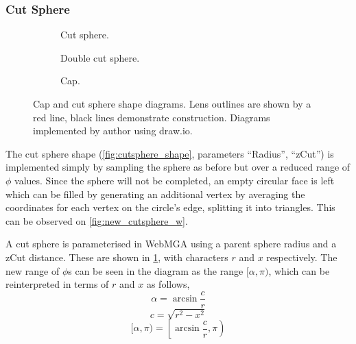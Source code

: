 \subsubsection{Cut Sphere}
\label{cut_sphere_section}
\begin{figure}
  \begin{center}
    \begin{subfigure}{0.3\textwidth}
      
      \caption{Cut sphere.}
      \label{fig:cut_sphere_diagram}
    \end{subfigure}
    \begin{subfigure}{0.3\textwidth}
      
      \caption{Double cut sphere.}
      \label{fig:double_cut_diagram}
    \end{subfigure}
    \begin{subfigure}{0.3\textwidth}
      
      \caption{Cap.}
      \label{fig:cap_diagram}
    \end{subfigure}
  \end{center}
  \caption{Cap and cut sphere shape diagrams. Lens outlines are shown by a red line, black lines demonstrate construction. Diagrams implemented by author using draw.io\cite{drawio}.}
  \label{fig:cap_cut_descriptions}
\end{figure}
The cut sphere shape (\cref{fig:cutsphere_shape}, parameters ``Radius'', ``zCut'') is implemented simply by sampling the sphere as before but over a reduced range of $\phi$ values. Since the sphere will not be completed, an empty circular face is left which can be filled by generating an additional vertex by averaging the coordinates for each vertex on the circle's edge, splitting it into triangles. This can be observed on \cref{fig:new_cutsphere_w}.

A cut sphere is parameterised in WebMGA using a parent sphere radius and a zCut distance. These are shown in \cref{fig:cut_sphere_diagram}, with characters $r$ and $x$ respectively. The new range of $\phi$s can be seen in the diagram as the range $[\alpha,\pi)$, which can be reinterpreted in terms of $r$ and $x$ as follows,
\begin{equation}
\alpha=\arcsin\frac{c}{r}
\end{equation}
\begin{equation}
c=\sqrt{r^2-x^2}
\end{equation}
\begin{equation}
[\alpha,\pi)=\left[\arcsin\frac{c}{r},\pi\right)
\end{equation}

